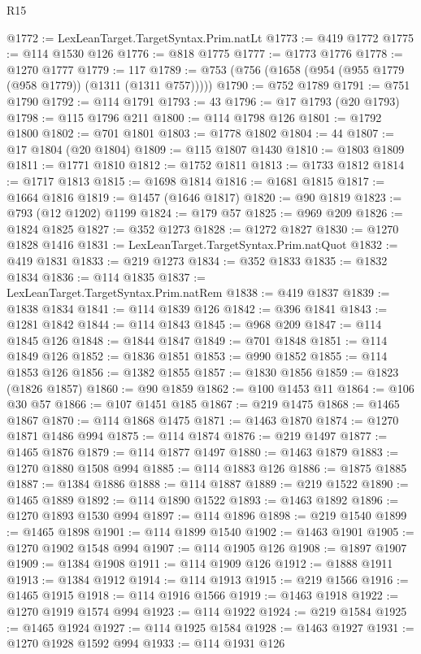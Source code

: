 \begin{lexlean}{R15}
\begin{coremodule}
@1772 := LexLeanTarget.TargetSyntax.Prim.natLt
@1773 := @419 @1772
@1775 := @114 @1530 @126
@1776 := @818 @1775
@1777 := @1773 @1776
@1778 := @1270 @1777
@1779 := 117
@1789 := @753 (@756 (@1658 (@954 (@955 @1779 (@958 @1779)) (@1311 (@1311 @757)))))
@1790 := @752 @1789
@1791 := @751 @1790
@1792 := @114 @1791
@1793 := 43
@1796 := @17 @1793 (@20 @1793)
@1798 := @115 @1796 @211
@1800 := @114 @1798 @126
@1801 := @1792 @1800
@1802 := @701 @1801
@1803 := @1778 @1802
@1804 := 44
@1807 := @17 @1804 (@20 @1804)
@1809 := @115 @1807 @1430
@1810 := @1803 @1809
@1811 := @1771 @1810
@1812 := @1752 @1811
@1813 := @1733 @1812
@1814 := @1717 @1813
@1815 := @1698 @1814
@1816 := @1681 @1815
@1817 := @1664 @1816
@1819 := @1457 (@1646 @1817)
@1820 := @90 @1819
@1823 := @793 (@12 @1202) @1199
@1824 := @179 @57
@1825 := @969 @209
@1826 := @1824 @1825
@1827 := @352 @1273
@1828 := @1272 @1827
@1830 := @1270 @1828 @1416
@1831 := LexLeanTarget.TargetSyntax.Prim.natQuot
@1832 := @419 @1831
@1833 := @219 @1273
@1834 := @352 @1833
@1835 := @1832 @1834
@1836 := @114 @1835
@1837 := LexLeanTarget.TargetSyntax.Prim.natRem
@1838 := @419 @1837
@1839 := @1838 @1834
@1841 := @114 @1839 @126
@1842 := @396 @1841
@1843 := @1281 @1842
@1844 := @114 @1843
@1845 := @968 @209
@1847 := @114 @1845 @126
@1848 := @1844 @1847
@1849 := @701 @1848
@1851 := @114 @1849 @126
@1852 := @1836 @1851
@1853 := @990 @1852
@1855 := @114 @1853 @126
@1856 := @1382 @1855
@1857 := @1830 @1856
@1859 := @1823 (@1826 @1857)
@1860 := @90 @1859
@1862 := @100 @1453 @11
@1864 := @106 @30 @57
@1866 := @107 @1451 @185
@1867 := @219 @1475
@1868 := @1465 @1867
@1870 := @114 @1868 @1475
@1871 := @1463 @1870
@1874 := @1270 @1871 @1486 @994
@1875 := @114 @1874
@1876 := @219 @1497
@1877 := @1465 @1876
@1879 := @114 @1877 @1497
@1880 := @1463 @1879
@1883 := @1270 @1880 @1508 @994
@1885 := @114 @1883 @126
@1886 := @1875 @1885
@1887 := @1384 @1886
@1888 := @114 @1887
@1889 := @219 @1522
@1890 := @1465 @1889
@1892 := @114 @1890 @1522
@1893 := @1463 @1892
@1896 := @1270 @1893 @1530 @994
@1897 := @114 @1896
@1898 := @219 @1540
@1899 := @1465 @1898
@1901 := @114 @1899 @1540
@1902 := @1463 @1901
@1905 := @1270 @1902 @1548 @994
@1907 := @114 @1905 @126
@1908 := @1897 @1907
@1909 := @1384 @1908
@1911 := @114 @1909 @126
@1912 := @1888 @1911
@1913 := @1384 @1912
@1914 := @114 @1913
@1915 := @219 @1566
@1916 := @1465 @1915
@1918 := @114 @1916 @1566
@1919 := @1463 @1918
@1922 := @1270 @1919 @1574 @994
@1923 := @114 @1922
@1924 := @219 @1584
@1925 := @1465 @1924
@1927 := @114 @1925 @1584
@1928 := @1463 @1927
@1931 := @1270 @1928 @1592 @994
@1933 := @114 @1931 @126

\end{coremodule}
\end{lexlean}
